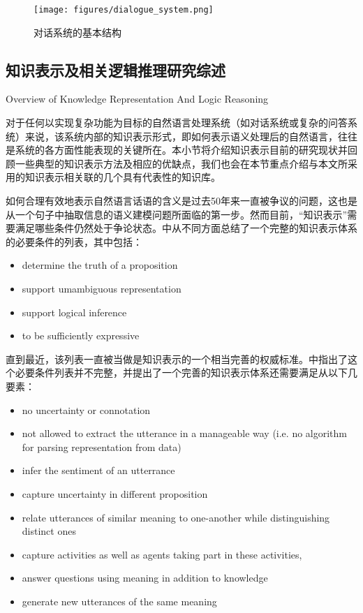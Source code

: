 \begin{figure}[htb]
\centering
\texttt{[image: figures/dialogue\_system.png]}
\caption{对话系统的基本结构}
\label{fig:dialogue}
\end{figure}


\subsection{知识表示及相关逻辑推理研究综述}{Overview of Knowledge Representation And Logic Reasoning}
\label{sec:representationReview}

对于任何以实现复杂功能为目标的自然语言处理系统（如对话系统或复杂的问答系统）来说，该系统内部的知识表示形式，即如何表示语义处理后的自然语言，往往是系统的各方面性能表现的关键所在。本小节将介绍知识表示目前的研究现状并回顾一些典型的知识表示方法及相应的优缺点，我们也会在本节重点介绍与本文所采用的知识表示相关联的几个具有代表性的知识库。

如何合理有效地表示自然语言话语的含义是过去50年来一直被争议的问题，这也是从一个句子中抽取信息的语义建模问题所面临的第一步。然而目前，“知识表示”需要满足哪些条件仍然处于争论状态。\cite{Jurafsky2008}中从不同方面总结了一个完整的知识表示体系的必要条件的列表，其中包括：

\begin{itemize}
\item determine the truth of a proposition
\item support umambiguous representation
\item support logical inference
\item to be sufficiently expressive
\end{itemize}

直到最近，该列表一直被当做是知识表示的一个相当完善的权威标准。\cite{Yarin2013}中指出了这个必要条件列表并不完整，并提出了一个完善的知识表示体系还需要满足从以下几要素：

\begin{itemize}
\item no uncertainty or connotation
\item not allowed to extract the utterance in a manageable way (i.e. no algorithm for parsing representation from data)
\item infer the sentiment of an utterrance 
\item capture uncertainty in different proposition
\item relate utterances of similar meaning to one-another while distinguishing distinct ones
\item capture activities as well as agents taking part in these activities,
\item answer questions using meaning in addition to knowledge
\item generate new utterances of the same meaning
\end{itemize}


